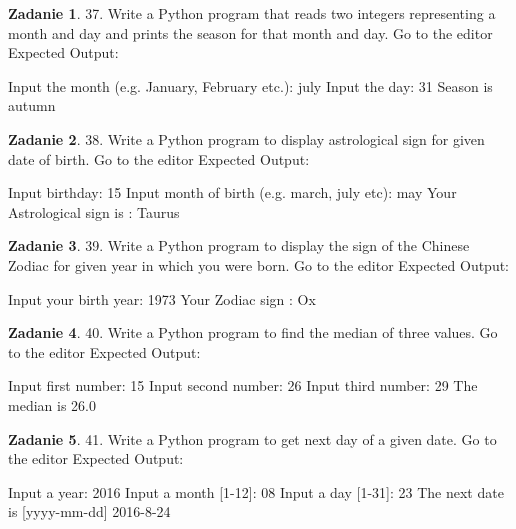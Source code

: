 \documentclass[11pt]{article}
\theoremstyle{definition}
\newtheorem{zadanie}{Zadanie}
\begin{document}
\begin{zadanie}


37. Write a Python program that reads two integers representing a month and day and prints the season for that month and day. Go to the editor
Expected Output:

Input the month (e.g. January, February etc.): july                     
Input the day: 31                                                       
Season is autumn  



\end{zadanie}

\begin{zadanie}


38. Write a Python program to display astrological sign for given date of birth. Go to the editor
Expected Output:

Input birthday: 15                                                      
Input month of birth (e.g. march, july etc): may                        
Your Astrological sign is : Taurus 



\end{zadanie}

\begin{zadanie}


39. Write a Python program to display the sign of the Chinese Zodiac for given year in which you were born. Go to the editor
Expected Output:

Input your birth year: 1973                                             
Your Zodiac sign : Ox  



\end{zadanie}

\begin{zadanie}


40. Write a Python program to find the median of three values. Go to the editor
Expected Output:

Input first number: 15                                                  
Input second number: 26                                                 
Input third number: 29                                                  
The median is 26.0   



\end{zadanie}

\begin{zadanie}


41. Write a Python program to get next day of a given date. Go to the editor
Expected Output:

Input a year: 2016                                                      
Input a month [1-12]: 08                                                
Input a day [1-31]: 23                                                  
The next date is [yyyy-mm-dd] 2016-8-24   



\end{zadanie}
\end{document}
